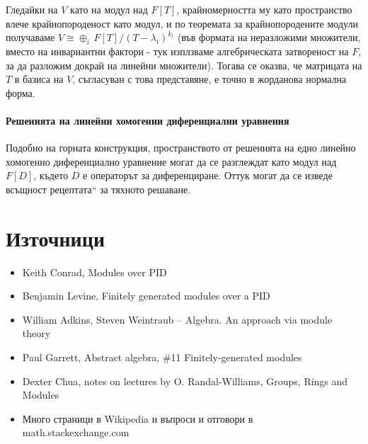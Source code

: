 \documentclass{article}
\newif\ifusemulticols
\theoremstyle{definition}
\theoremstyle{remark}
\theoremstyle{plain}
\theoremstyle{plain}
\newenvironment{mymulticols}
    { \ifusemulticols \begin{multicols}{2} \fi }
    { \ifusemulticols \end{multicols} \fi }
\begin{document}
\begin{mymulticols}
Гледайки на $V$ като на модул над $F[T]$, крайномерността му като пространство влече
крайнопороденост като модул, и по теоремата за крайнопородените модули получаваме $V \cong \oplus_i
\, F[T]/(T-\lambda_i)^{k_i}$ (във формата на неразложими множители, вместо на инвариантни фактори -
тук изплзваме алгебрическата затвореност на $F$, за да разложим докрай на линейни множители). Тогава
се оказва, че матрицата на $T$ в базиса на $V$, съгласуван с това представяне, е точно в жорданова
нормална форма.

\paragraph{Решенията на линейни хомогенни диференциални уравнения}
Подобно на горната конструкция, пространството от решенията на едно линейно хомогенно
диференциално уравнение могат да се разглеждат като модул над $F[D]$, където $D$ е операторът за
диференциране. Оттук могат да се изведе всъщност \quotedblbase рецептата`` за тяхното решаване.

\section{Източници}%

\begin{itemize}
    \item Keith Conrad, Modules over PID
    \item Benjamin Levine, Finitely generated modules over a PID
    \item William Adkins, Steven Weintraub -- Algebra. An approach via module theory
    \item Paul Garrett, Abstract algebra, \#11 Finitely-generated modules
    \item Dexter Chua, notes on lectures by O. Randal-Williams, Groups, Rings and Modules
    \item Много страници в Wikipedia и въпроси и отговори в math.stackexchange.com
\end{itemize}

\end{mymulticols}
\end{document}
